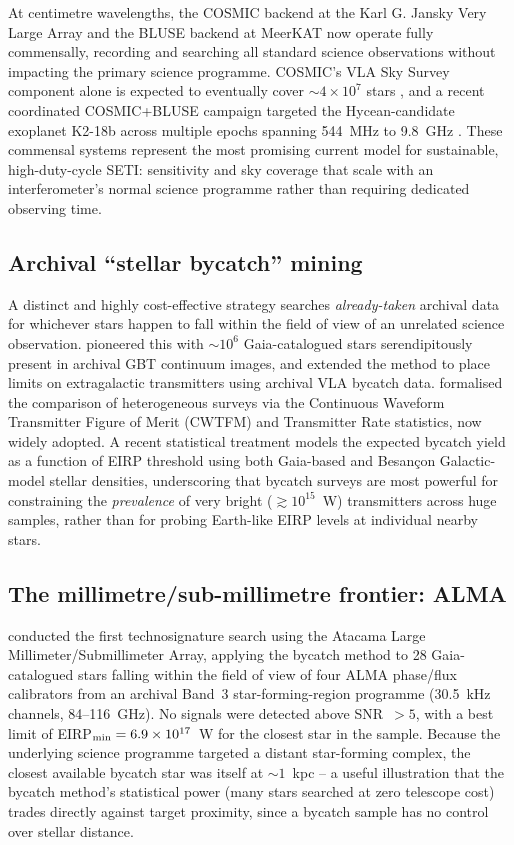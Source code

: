 \documentclass[10pt,twocolumn]{article}
\begin{document}
At centimetre wavelengths, the COSMIC backend at the Karl G. Jansky Very Large Array \citep{tremblay2023} and the BLUSE backend at MeerKAT \citep{czech2021,tremblay2026} now operate fully commensally, recording and searching all standard science observations without impacting the primary science programme. COSMIC's VLA Sky Survey component alone is expected to eventually cover $\sim4\times10^7$ stars \citep{cosmic2025}, and a recent coordinated COSMIC+BLUSE campaign targeted the Hycean-candidate exoplanet K2-18b across multiple epochs spanning 544~MHz to 9.8~GHz \citep{k218b2026}. These commensal systems represent the most promising current model for sustainable, high-duty-cycle SETI: sensitivity and sky coverage that scale with an interferometer's normal science programme rather than requiring dedicated observing time.

\subsection{Archival ``stellar bycatch'' mining}
A distinct and highly cost-effective strategy searches \emph{already-taken} archival data for whichever stars happen to fall within the field of view of an unrelated science observation. \citet{wlodarczyk2020} pioneered this with $\sim10^6$ Gaia-catalogued stars serendipitously present in archival GBT continuum images, and \citet{garrett2022,garrett2023} extended the method to place limits on extragalactic transmitters using archival VLA bycatch data. \citet{houston2021} formalised the comparison of heterogeneous surveys via the Continuous Waveform Transmitter Figure of Merit (CWTFM) and Transmitter Rate statistics, now widely adopted. A recent statistical treatment \citep{bycatch2025} models the expected bycatch yield as a function of EIRP threshold using both Gaia-based and Besan\c{c}on Galactic-model stellar densities, underscoring that bycatch surveys are most powerful for constraining the \emph{prevalence} of very bright ($\gtrsim10^{15}$~W) transmitters across huge samples, rather than for probing Earth-like EIRP levels at individual nearby stars.

\subsection{The millimetre/sub-millimetre frontier: ALMA}
\citet{mason2024} conducted the first technosignature search using the Atacama Large Millimeter/Submillimeter Array, applying the bycatch method to 28 Gaia-catalogued stars falling within the field of view of four ALMA phase/flux calibrators from an archival Band~3 star-forming-region programme (30.5~kHz channels, 84--116~GHz). No signals were detected above SNR~$>5$, with a best limit of EIRP$_{\rm min}=6.9\times10^{17}$~W for the closest star in the sample. Because the underlying science programme targeted a distant star-forming complex, the closest available bycatch star was itself at $\sim1$~kpc -- a useful illustration that the bycatch method's statistical power (many stars searched at zero telescope cost) trades directly against target proximity, since a bycatch sample has no control over stellar distance.
\end{document}
